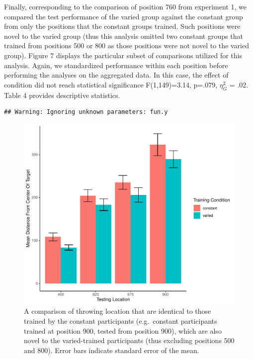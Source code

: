 \documentclass[
  man,floatsintext]{apa7}
\begin{document}
Finally, corresponding to the comparison of position 760 from experiment 1, we compared the test performance of the varied group against the constant group from only the positions that the constant groups trained. Such positions were novel to the varied group (thus this analysis omitted two constant groups that trained from positions 500 or 800 as those positions were not novel to the varied group). Figure 7 displays the particular subset of comparisons utilized for this analysis. Again, we standardized performance within each position before performing the analyses on the aggregated data. In this case, the effect of condition did not reach statistical significance F(1,149)=3.14, p=.079, \(\eta^{2}_G\) = .02. Table 4 provides descriptive statistics.



\begin{verbatim}
## Warning: Ignoring unknown parameters: fun.y
\end{verbatim}

\begin{figure}
\centering
\includegraphics{IGAS_PJ_files/figure-latex/e2test2-1.pdf}
\caption{\label{fig:e2test2}A comparison of throwing location that are identical to those trained by the constant participants (e.g.~constant participants trained at position 900, tested from position 900), which are also novel to the varied-trained participants (thus excluding positions 500 and 800). Error bars indicate standard error of the mean.}
\end{figure}
\end{document}
